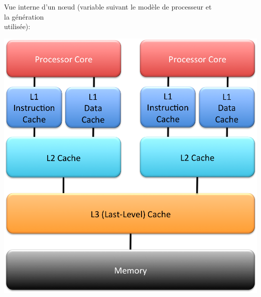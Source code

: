 \documentclass{beamer}
\begin{document}
\begin{frame}
Vue interne d'un n\oe ud (variable suivant le mod\`ele de processeur et \\la g\'en\'eration \\utilis\'ee):

\begin{center}
\includegraphics[scale=0.3]{architecture2}
\end{center}

\end{frame}
\end{document}
